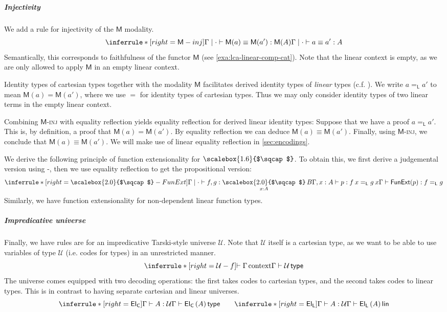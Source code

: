 \documentclass[a4paper,UKenglish,cleveref,numberwithinsect, autoref, thm-restate]{lipics-v2021}
\newcommand{\Sqcap}{%
  \mathop{%
    \mathchoice
      {\scalebox{2.0}{$\sqcap$}}%
      {\scalebox{1.6}{$\sqcap$}}%
      {\scalebox{1.2}{$\sqcap$}}%
      {\scalebox{1.0}{$\sqcap$}}%
  }\displaylimits
}
\newcommand{\Univ}{\mathcal{U}}
\newcommand{\El}{\mathsf{El}}
\newcommand{\ElC}[1]{\El_{\mathsf{C}}\left(#1\right)}
\newcommand{\ElL}[1]{\El_{\mathsf{L}}\left(#1\right)}
\newcommand{\FunExt}[1]{\mathsf{FunExt}(#1)}
\newcommand{\cartyp}[1]{{#1}\,\mathsf{type}}
\newcommand{\lintyp}[1]{{#1}\,\mathsf{lin}}
\newcommand{\judeq}{\mathrel{\equiv}}
\newcommand{\lineq}[2]{#1 =_\mathsf{L} #2}
\newcommand{\m}{\mathsf{M}}
\begin{document}

\subparagraph*{Injectivity}

We add a rule for injectivity of the $\m$ modality.
\[
\inferrule*[right=\text{$\m$}-inj]
{\Gamma \mid \cdot \vdash \m(a) \judeq \m(a'): \m(A)
}
{\Gamma \mid \cdot \vdash a \judeq a': A}
\]
Semantically, this corresponds to faithfulness of the functor $\m$ (see \autoref{exa:lca-linear-comp-cat}). Note that the linear context is empty, as we are only allowed to apply $\m$ in an empty linear context.

Identity types of cartesian types together with the modality $\m$ facilitates derived identity types of \textit{linear} types (c.f. \cite[Section 6.2]{lundfall:2017}). We write $\lineq{a}{a'}$ to mean $\m(a) = \m(a')$, where we use $=$ for identity types of cartesian types. Thus we may only consider identity types of two linear terms in the empty linear context.

Combining $\m$-\textsc{inj} with equality reflection yields equality reflection for derived linear identity types: Suppose that we have a proof $\lineq{a}{a'}$. This is, by definition, a proof that $\m(a) = \m(a')$. By equality reflection we can deduce $\m(a) \equiv \m(a')$. Finally, using $\m$-\textsc{inj}, we conclude that $\m(a)\equiv \m(a')$. We will make use of linear equality reflection in \autoref{sec:encodings}.

We derive the following principle of function extensionality for $\Sqcap$. To obtain this, we first derive a judgemental version using \text{$\Sqcap$}-\text{$\eta$}, then we use equality reflection to get the propositional version:
\[
\inferrule*[right=\text{$\Sqcap$}-FunExt]
{\Gamma \mid \cdot \vdash f, g : \Sqcap_{x : A} B
\\
\Gamma, x : A \vdash p : \lineq{f \> x}{g \> x}}
{\Gamma \vdash \FunExt{p} : \lineq{f}{g} }
\]
Similarly,
we have function extensionality for non-dependent linear function types.

\subparagraph*{Impredicative universe}
Finally, we have rules are for an impredicative Tarski-style universe $\Univ$.
Note that $\Univ$ itself is a cartesian type, as we want to be able to use variables of type $\Univ$ (i.e. codes for types) in an unrestricted manner.
\[
\inferrule*[right=\text{$\Univ$}-f]
{\vdash \Gamma \, \text{context}
}
{\Gamma \vdash \cartyp{\Univ}}
\]
The universe comes equipped with two decoding operations: the first takes codes to cartesian types, and the second takes codes to linear types.
This is in contrast to having separate cartesian and linear universes.
\[
\inferrule*[right=\text{$\mathsf{El_C}$}]
{\Gamma \vdash A: \Univ
}
{\Gamma \vdash \cartyp{\ElC{A}}}
\qquad
\inferrule*[right=\text{$\mathsf{El_L}$}]
{\Gamma \vdash A: \Univ
}
{\Gamma \vdash \lintyp{\ElL{A}}}
\]
\end{document}
